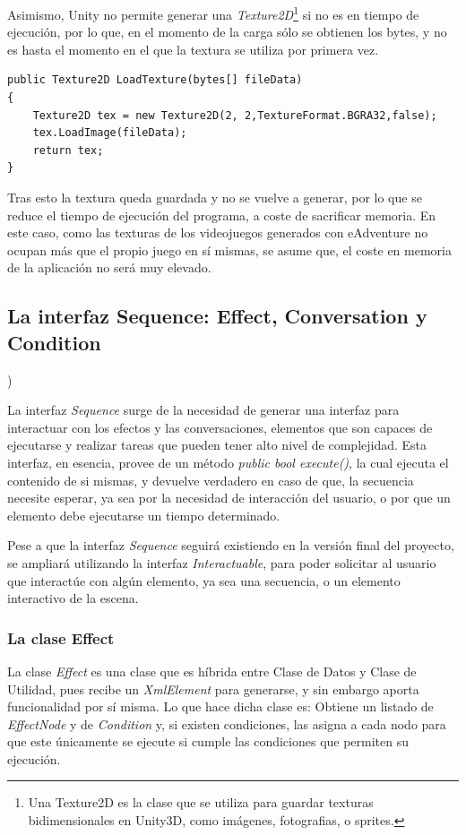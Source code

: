 Asimismo, Unity no permite generar una \textit{Texture2D}\footnote{Una Texture2D es la clase que se utiliza para guardar texturas bidimensionales en Unity3D, como imágenes, fotografias, o sprites.} si no es en tiempo de ejecución, por lo que, en el momento de la carga sólo se obtienen los bytes, y no es hasta el momento en el que la textura se utiliza por primera vez.

\begin{lstlisting}
public Texture2D LoadTexture(bytes[] fileData)
{
	Texture2D tex = new Texture2D(2, 2,TextureFormat.BGRA32,false);
	tex.LoadImage(fileData);
	return tex;
}
\end{lstlisting}

Tras esto la textura queda guardada y no se vuelve a generar, por lo que se reduce el tiempo de ejecución del programa, a coste de sacrificar memoria. En este caso, como las texturas de los videojuegos generados con eAdventure no ocupan más que el propio juego en sí mismas, se asume que, el coste en memoria de la aplicación no será muy elevado.

\subsection{La interfaz Sequence: Effect, Conversation y Condition})

La interfaz \textit{Sequence} surge de la necesidad de generar una interfaz para interactuar con los efectos y las conversaciones, elementos que son capaces de ejecutarse y realizar tareas que pueden tener alto nivel de complejidad. Esta interfaz, en esencia, provee de un método \textit{public bool execute()}, la cual ejecuta el contenido de si mismas, y devuelve verdadero en caso de que, la secuencia necesite esperar, ya sea por la necesidad de interacción del usuario, o por que un elemento debe ejecutarse un tiempo determinado.

Pese a que la interfaz \textit{Sequence} seguirá existiendo en la versión final del proyecto, se ampliará utilizando la interfaz \textit{Interactuable}, para poder solicitar al usuario que interactúe con algún elemento, ya sea una secuencia, o un elemento interactivo de la escena.

\subsubsection{La clase Effect}

La clase \textit{Effect} es una clase que es híbrida entre Clase de Datos y Clase de Utilidad, pues recibe un \textit{XmlElement} para generarse, y sin embargo aporta funcionalidad por sí misma. Lo que hace dicha clase es: Obtiene un listado de \textit{EffectNode} y de \textit{Condition} y, si existen condiciones, las asigna a cada nodo para que este únicamente se ejecute si cumple las condiciones que permiten su ejecución.

